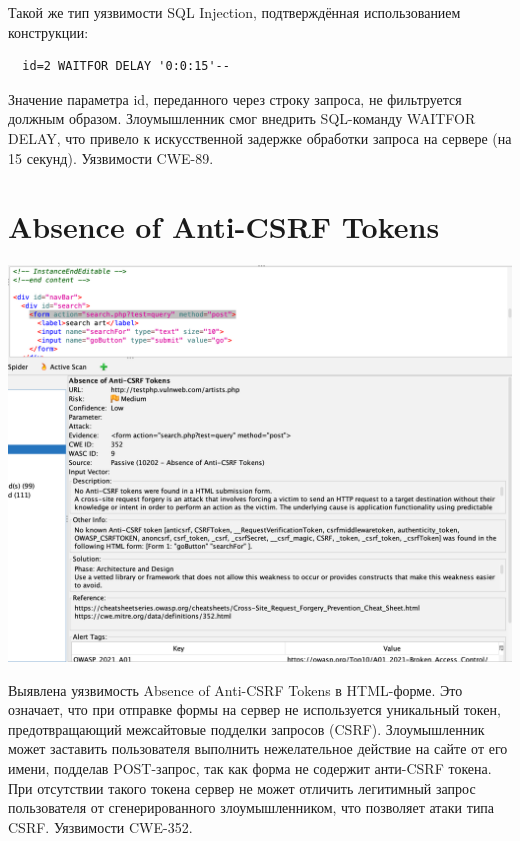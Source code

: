 \documentclass{article}
\begin{document}
Такой же тип уязвимости SQL Injection, подтверждённая использованием конструкции:

\begin{lstlisting}
  id=2 WAITFOR DELAY '0:0:15'--
\end{lstlisting}

Значение параметра id, переданного через строку запроса, не фильтруется должным образом. Злоумышленник смог внедрить SQL-команду WAITFOR DELAY, что привело к искусственной задержке обработки запроса на сервере (на 15 секунд).
Уязвимости CWE-89.

\section{Absence of Anti-CSRF Tokens}

\begin{center}
  \includegraphics[width=.9\textwidth]{5}
\end{center}

Выявлена уязвимость Absence of Anti-CSRF Tokens в HTML-форме. Это означает, что при отправке формы на сервер не используется уникальный токен, предотвращающий межсайтовые подделки запросов (CSRF).
Злоумышленник может заставить пользователя выполнить нежелательное действие на сайте от его имени, подделав POST-запрос, так как форма не содержит анти-CSRF токена. При отсутствии такого токена сервер не может отличить легитимный запрос пользователя от сгенерированного злоумышленником, что позволяет атаки типа CSRF.
Уязвимости CWE-352.
\end{document}
